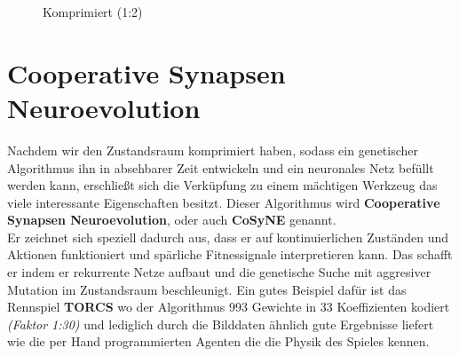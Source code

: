 \begin{multicols}{2}
\begin{figure}[H]
\begin{center}
                        \caption{Komprimiert (1:2)}\label{fig:dct-after}
                    \end{center}
                \end{figure}
            \end{multicols}

    \section{Cooperative Synapsen Neuroevolution}
        Nachdem wir den Zustandsraum komprimiert haben, sodass ein genetischer Algorithmus ihn in absehbarer Zeit entwickeln und ein neuronales Netz befüllt werden kann, erschließt sich die Verküpfung zu einem mächtigen Werkzeug das viele interessante Eigenschaften besitzt. Dieser Algorithmus wird \textbf{Cooperative Synapsen Neuroevolution}\cite{cosyne2}, oder auch \textbf{CoSyNE} genannt.\\

        \noindent
        Er zeichnet sich speziell dadurch aus, dass er auf kontinuierlichen Zuständen und Aktionen funktioniert und spärliche Fitnessignale interpretieren kann. Das schafft er indem er rekurrente Netze aufbaut und die genetische Suche mit aggresiver Mutation im Zustandsraum beschleunigt. Ein gutes Beispiel dafür ist das Rennspiel \textbf{TORCS}\cite{cosyne3} wo der Algorithmus 993 Gewichte in 33 Koeffizienten kodiert \textit{(Faktor 1:30)} und lediglich durch die Bilddaten ähnlich gute Ergebnisse liefert wie die per Hand programmierten Agenten die die Physik des Spieles kennen.\\

